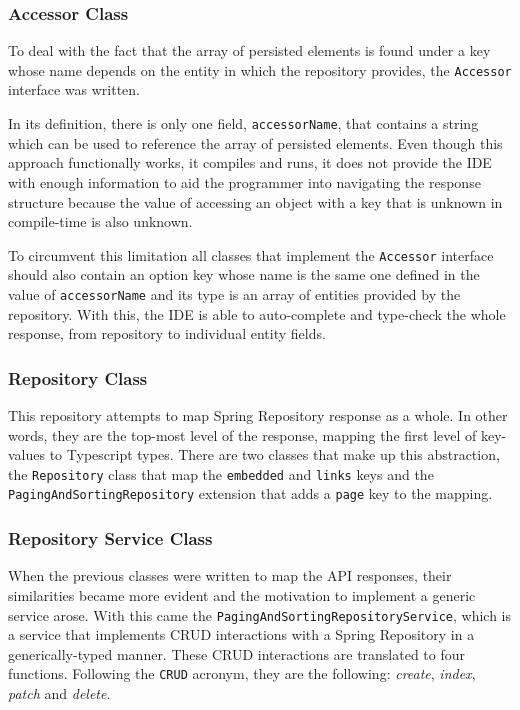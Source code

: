 \subsubsection{Accessor Class}
To deal with the fact that the array of persisted elements is found under a key whose name depends on the entity in which the repository provides, the \texttt{Accessor} interface was written.

In its definition, there is only one field, \texttt{accessorName}, that contains a string which can be used to reference the array of persisted elements. Even though this approach functionally works, it compiles and runs, it does not provide the \gls{IDE} with enough information to aid the programmer into navigating the response structure because the value of accessing an object with a key that is unknown in compile-time is also unknown.

To circumvent this limitation all classes that implement the \texttt{Accessor} interface should also contain an option key whose name is the same one defined in the value of \texttt{accessorName} and its type is an array of entities provided by the repository. With this, the \gls{IDE} is able to auto-complete and type-check the whole response, from repository to individual entity fields.

\subsubsection{Repository Class}
This repository attempts to map Spring Repository response as a whole. In other words, they are the top-most level of the response, mapping the first level of key-values to Typescript types. There are two classes that make up this abstraction, the \texttt{Repository} class that map the \texttt{\textunderscore embedded} and \texttt{\textunderscore links} keys and the \texttt{PagingAndSortingRepository} extension that adds a \texttt{page} key to the mapping.

\subsubsection{Repository Service Class}\label{hateoas:service}
When the previous classes were written to map the \gls{API} responses, their similarities became more evident and the motivation to implement a generic service arose. With this came the \texttt{PagingAndSortingRepositoryService}, which is a service that implements \gls{CRUD} interactions with a Spring Repository in a generically-typed manner. These \gls{CRUD} interactions are translated to four functions. Following the \texttt{CRUD} acronym, they are the following: \textit{create}, \textit{index}, \textit{patch} and \textit{delete}.

